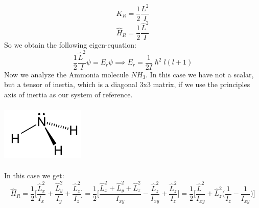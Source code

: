 \documentclass{article}
\begin{document}
$$K_R = \frac{1}{2} \frac{L^2}{I}$$
$$\hat{H}_R = \frac{1}{2} \frac{\hat{L}^2}{I}$$
So we obtain the following eigen-equation:
$$\frac{1}{2} \frac{\hat{L}^2}{I} \psi = E_r \psi \implies E_r = \frac{1}{2I}\hslash^2 l(l+1)$$
Now we analyze the Ammonia molecule $NH_3$.
In this case we have not a scalar, but a tensor of inertia, which is a diagonal $3$x$3$ matrix, if we use the principles axis of inertia as our system of reference.\\ \\ 
\includegraphics[scale = 0.5]{ammonia.png} \\  \\
In this case we get:
$$ \hat{H}_R = \frac{1}{2} \Biggl[ \frac{\hat{L}_x^2}{I_x} + \frac{\hat{L}_y^2}{I_y}+ \frac{\hat{L}_z^2}{I_z} \Biggl] = \frac{1}{2} \Biggl[ \frac{\hat{L}_x^2 + \hat{L}_y^2 + \hat{L}_z^2}{I_{xy}}- \frac{\hat{L}_z^2}{I_{xy}} + \frac{\hat{L}_z^2}{I_z} \Biggl] = \frac{1}{2} \Biggl[ \frac{\hat{L}^2}{I_{xy}} + \hat{L}_z^2 \Biggl( \frac{1}{I_z}- \frac{1}{I_{xy}} \biggl) \Biggl]
$$
\end{document}
